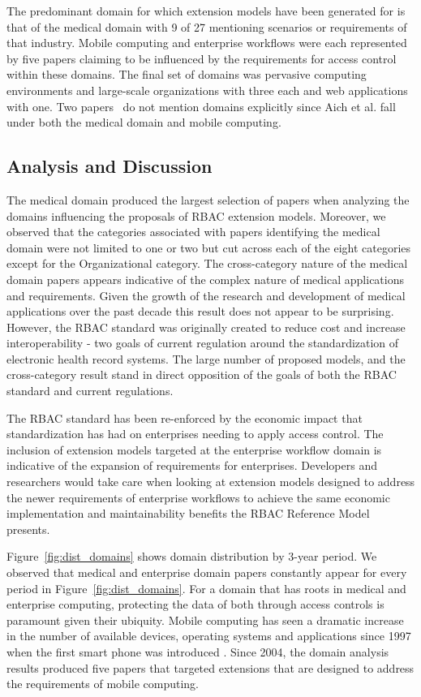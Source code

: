 The predominant domain for which extension models have been generated for is that of the medical domain with 9 of 27 mentioning scenarios or requirements of that industry.
Mobile computing and enterprise workflows were each represented by five papers claiming to be influenced by the requirements for access control within these domains. The final set
of domains was pervasive computing environments and large-scale organizations with three each and web applications with one.  Two papers~\cite{jian2008extended, aich07:STARBAC} do not mention domains explicitly since Aich et al. \cite{aich09:role} fall under both the medical domain and mobile computing.

\subsection{Analysis and Discussion}

The medical domain produced the largest selection of papers when analyzing the domains influencing the proposals of RBAC extension models.  
Moreover, we observed that the categories associated with papers identifying the medical domain were not limited to one or two but cut across
each of the eight categories except for the Organizational category. 
The cross-category nature of the medical domain papers appears indicative of the complex nature of medical applications and requirements.
Given the growth of the research and development of medical applications over the past decade this result does not appear to be surprising. However,
the RBAC standard was originally created to reduce cost and increase interoperability - two goals of current regulation around the standardization
of electronic health record systems. The large number of proposed models, and the cross-category result stand in direct opposition of the goals
of both the RBAC standard and current regulations.

The RBAC standard has been re-enforced by the economic impact that standardization has had on enterprises needing to apply access control.  The
inclusion of extension models targeted at the enterprise workflow domain is indicative of the expansion of requirements for enterprises. Developers
and researchers would take care when looking at extension models designed to address the newer requirements of enterprise workflows to
achieve the same economic implementation and maintainability benefits the RBAC Reference Model presents.

Figure~\ref{fig:dist_domains} shows domain distribution by 3-year period.
We observed that medical and enterprise domain papers constantly appear for every period in Figure~\ref{fig:dist_domains}.
For a domain that has roots in medical and enterprise computing, protecting the data of both through access controls is paramount given their ubiquity. 
Mobile computing has seen a dramatic increase in the number of available devices, operating systems and applications since 1997 when the first smart phone was introduced \cite{buck2013new}. Since 2004, the domain analysis results produced five papers that targeted extensions that are designed to address the requirements of mobile computing. 

